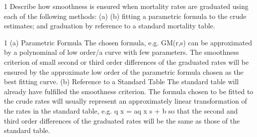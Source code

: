 \documentclass[a4paper,12pt]{article}
\begin{document}
1
Describe how smoothness is ensured when mortality rates are graduated
using each of the following methods:
(a)
(b)
fitting a parametric formula to the crude estimates; and
graduation by reference to a standard mortality table.

1
(a)
Parametric Formula
The chosen formula, e.g. GM(r,s) can be approximated by a polynominal of
low order/a curve with few parameters.
The smoothness criterion of small second or third order differences of the
graduated rates will be ensured by the approximate low order of the
parametric formula chosen as the best fitting curve.
(b)
Reference to a Standard Table
The standard table will already have fulfilled the smoothness criterion.
The formula chosen to be fitted to the crude rates will usually represent
an approximately linear transformation of the rates in the standard table,
e.g. q x = aq x s + b so that the second and third order differences of the
graduated rates will be the same as those of the standard table.
\end{document}
